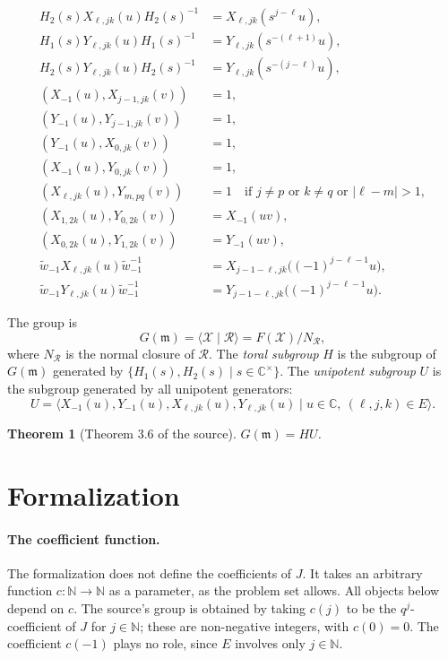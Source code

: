 \documentclass[11pt]{article}
\newtheorem{theorem}{Theorem}[section]
\theoremstyle{definition}
\theoremstyle{remark}
\newcommand{\Cx}{\mathbb{C}^{\times}}
\newcommand{\wt}{\widetilde{w}}
\begin{document}
\begin{align*}
\tag{Im:6b} H_2(s)X_{\ell,jk}(u)H_2(s)^{-1}&=X_{\ell,jk}(s^{j-\ell}u),\\
\tag{Im:6c} H_1(s)Y_{\ell,jk}(u)H_1(s)^{-1}&=Y_{\ell,jk}(s^{-(\ell+1)}u),\\
\tag{Im:6d} H_2(s)Y_{\ell,jk}(u)H_2(s)^{-1}&=Y_{\ell,jk}(s^{-(j-\ell)}u),\\
\tag{U:1a} (X_{-1}(u),X_{j-1,jk}(v))&=1,\\
\tag{U:1b} (Y_{-1}(u),Y_{j-1,jk}(v))&=1,\\
\tag{U:1c} (Y_{-1}(u),X_{0,jk}(v))&=1,\\
\tag{U:1d} (X_{-1}(u),Y_{0,jk}(v))&=1,\\
\tag{U:2} (X_{\ell,jk}(u),Y_{m,pq}(v))&=1\quad\text{if } j\ne p \text{ or } k\ne q \text{ or } |\ell-m|>1,\\
\tag{U:3a} (X_{1,2k}(u),Y_{0,2k}(v))&=X_{-1}(uv),\\
\tag{U:3b} (X_{0,2k}(u),Y_{1,2k}(v))&=Y_{-1}(uv),\\
\tag{U:4a} \wt_{-1}X_{\ell,jk}(u)\wt_{-1}^{-1}&=X_{j-1-\ell,jk}\bigl((-1)^{j-\ell-1}u\bigr),\\
\tag{U:4b} \wt_{-1}Y_{\ell,jk}(u)\wt_{-1}^{-1}&=Y_{j-1-\ell,jk}\bigl((-1)^{j-\ell-1}u\bigr).
\end{align*}
\endgroup

The group is
\[
G(\mathfrak{m})=\langle\mathcal{X}\mid\mathcal{R}\rangle=F(\mathcal{X})/N_{\mathcal{R}},
\]
where $N_{\mathcal{R}}$ is the normal closure of $\mathcal{R}$. The \emph{toral subgroup} $H$ is the subgroup of $G(\mathfrak{m})$ generated by $\{H_1(s),H_2(s)\mid s\in\Cx\}$. The \emph{unipotent subgroup} $U$ is the subgroup generated by all unipotent generators:
\[
U=\langle X_{-1}(u),Y_{-1}(u),X_{\ell,jk}(u),Y_{\ell,jk}(u)\mid u\in\mathbb{C},\ (\ell,j,k)\in E\rangle.
\]

\begin{theorem}[Theorem 3.6 of the source]
$G(\mathfrak{m})=HU$.
\end{theorem}

\section{Formalization}

\paragraph{The coefficient function.}
The formalization does not define the coefficients of $J$. It takes an arbitrary function $c\colon\mathbb{N}\to\mathbb{N}$ as a parameter, as the problem set allows. All objects below depend on $c$. The source's group is obtained by taking $c(j)$ to be the $q^j$-coefficient of $J$ for $j\in\mathbb{N}$; these are non-negative integers, with $c(0)=0$. The coefficient $c(-1)$ plays no role, since $E$ involves only $j\in\mathbb{N}$.
\end{document}
